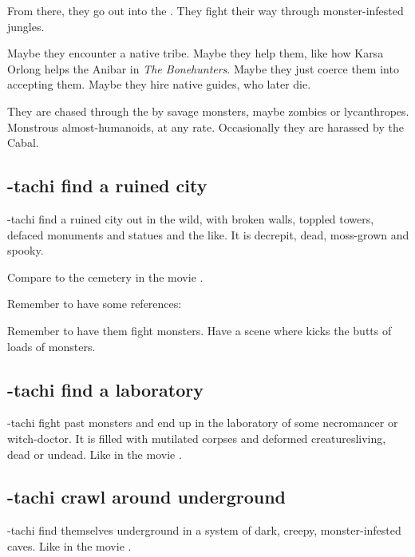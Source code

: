 From there, they go out into the \Wylde{}. They fight their way through monster-infested jungles. 

Maybe they encounter a native tribe. Maybe they help them, like how Karsa Orlong helps the Anibar in \emph{The Bonehunters}. Maybe they just coerce them into accepting them. Maybe they hire native guides, who later die. 

They are chased through the \Wylde{} by savage monsters, maybe zombies or lycanthropes. Monstrous almost-humanoids, at any rate. Occasionally they are harassed by the Cabal. 







\subsection{\Shilred-tachi find a ruined city}
\Shilred-tachi find a ruined city out in the wild, with broken walls, toppled towers, defaced monuments and statues and the like. It is decrepit, dead, moss-grown and spooky. 

Compare to the cemetery in the movie \cite{Movie:HouseoftheDead}. 

Remember to have some references: 

Remember to have them fight monsters. Have a scene where \Dzasselid{} kicks the butts of loads of monsters. 







\subsection{\Shilred-tachi find a laboratory}
\Shilred-tachi fight past monsters and end up in the laboratory of some necromancer or witch-doctor. It is filled with mutilated corpses and deformed creatures\dash living, dead or undead. Like in the movie \cite{Movie:HouseoftheDead}. 







\subsection{\Shilred-tachi crawl around underground}
\Shilred-tachi find themselves underground in a system of dark, creepy, monster-infested caves. Like in the movie \cite{Movie:HouseoftheDead}. 









